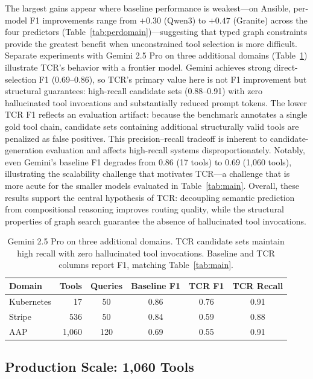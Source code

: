 \documentclass{article}
\begin{document}
The largest gains appear where baseline performance is weakest---on Ansible, per-model F1 improvements range from $+0.30$ (Qwen3) to $+0.47$ (Granite) across the four predictors (Table~\ref{tab:perdomain})---suggesting that typed graph constraints provide the greatest benefit when unconstrained tool selection is more difficult. Separate experiments with Gemini 2.5 Pro on three additional domains (Table~\ref{tab:gemini}) illustrate TCR's behavior with a frontier model. Gemini achieves strong direct-selection F1 (0.69--0.86), so TCR's primary value here is not F1 improvement but structural guarantees: high-recall candidate sets (0.88--0.91) with zero hallucinated tool invocations and substantially reduced prompt tokens. The lower TCR F1 reflects an evaluation artifact: because the benchmark annotates a single gold tool chain, candidate sets containing additional structurally valid tools are penalized as false positives. This precision--recall tradeoff is inherent to candidate-generation evaluation and affects high-recall systems disproportionately. Notably, even Gemini's baseline F1 degrades from 0.86 (17 tools) to 0.69 (1,060 tools), illustrating the scalability challenge that motivates TCR---a challenge that is more acute for the smaller models evaluated in Table~\ref{tab:main}. Overall, these results support the central hypothesis of TCR: decoupling semantic prediction from compositional reasoning improves routing quality, while the structural properties of graph search guarantee the absence of hallucinated tool invocations.

\begin{table}[htbp]
  \centering
  \caption{Gemini 2.5 Pro on three additional domains. TCR candidate sets maintain high recall with zero hallucinated tool invocations. Baseline and TCR columns report F1, matching Table~\ref{tab:main}.}
  \label{tab:gemini}
  \begin{tabular}{lrcccc}
    \toprule
    \textbf{Domain} & \textbf{Tools} & \textbf{Queries} & \textbf{Baseline F1} & \textbf{TCR F1} & \textbf{TCR Recall} \\
    \midrule
    Kubernetes  & 17    & 50  & 0.86 & 0.76 & 0.91 \\
    Stripe      & 536   & 50  & 0.84 & 0.59 & 0.88 \\
    AAP         & 1,060 & 120 & 0.69 & 0.55 & 0.91 \\
    \bottomrule
  \end{tabular}
\end{table}

\subsection{Production Scale: 1,060 Tools}\label{sec:production}
\end{document}
